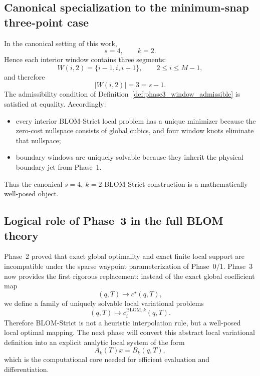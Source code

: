 \subsection{Canonical specialization to the minimum-snap three-point case}
\label{subsec:phase3_canonical_specialization}

In the canonical setting of this work,
\[
s=4,\qquad k=2.
\]
Hence each interior window contains three segments:
\[
W(i,2)=\{i-1,i,i+1\},
\qquad 2\le i\le M-1,
\]
and therefore
\[
|W(i,2)|=3=s-1.
\]
The admissibility condition of Definition~\ref{def:phase3_window_admissible} is satisfied at equality.
Accordingly:
\begin{itemize}
    \item every interior BLOM-Strict local problem has a unique minimizer because the zero-cost nullspace consists of global cubics, and four window knots eliminate that nullspace;
    \item boundary windows are uniquely solvable because they inherit the physical boundary jet from Phase~1.
\end{itemize}
Thus the canonical \(s=4,\ k=2\) BLOM-Strict construction is a mathematically well-posed object.

\subsection{Logical role of Phase~3 in the full BLOM theory}
\label{subsec:phase3_logical_role}

Phase~2 proved that exact global optimality and exact finite local support are incompatible under the sparse waypoint parameterization of Phase~0/1.
Phase~3 now provides the first rigorous replacement:
instead of the exact global coefficient map
\[
(q,T)\longmapsto c^\star(q,T),
\]
we define a family of uniquely solvable local variational problems
\[
(q,T)\longmapsto c_i^{\mathrm{BLOM},k}(q,T).
\]
Therefore BLOM-Strict is not a heuristic interpolation rule, but a well-posed local optimal mapping.
The next phase will convert this abstract local variational definition into an explicit analytic local system of the form
\[
A_k(T)x=B_k(q,T),
\]
which is the computational core needed for efficient evaluation and differentiation.